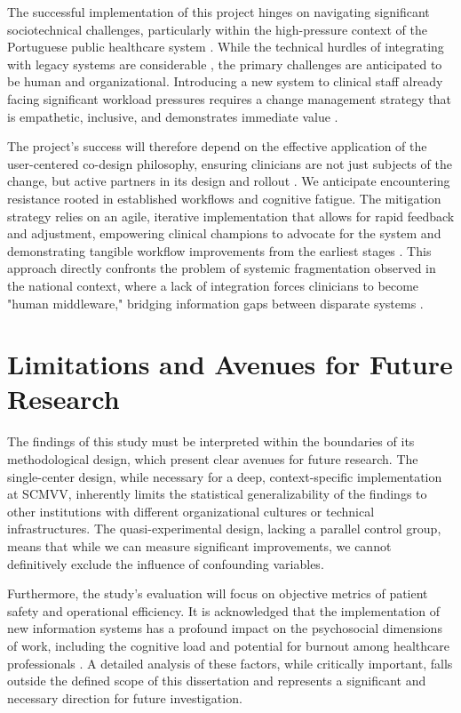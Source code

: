 The successful implementation of this project hinges on navigating significant sociotechnical challenges, particularly within the high-pressure context of the Portuguese public healthcare system \cite{goiana2024portuguese}. While the technical hurdles of integrating with legacy systems are considerable \cite{keasberry2017}, the primary challenges are anticipated to be human and organizational. Introducing a new system to clinical staff already facing significant workload pressures requires a change management strategy that is empathetic, inclusive, and demonstrates immediate value \cite{rogers2003}.

The project's success will therefore depend on the effective application of the user-centered co-design philosophy, ensuring clinicians are not just subjects of the change, but active partners in its design and rollout \cite{venkatesh2003}. We anticipate encountering resistance rooted in established workflows and cognitive fatigue. The mitigation strategy relies on an agile, iterative implementation that allows for rapid feedback and adjustment, empowering clinical champions to advocate for the system and demonstrating tangible workflow improvements from the earliest stages \cite{may2013}. This approach directly confronts the problem of systemic fragmentation observed in the national context, where a lack of integration forces clinicians to become "human middleware," bridging information gaps between disparate systems \cite{pinto2016identification}.

\section{Limitations and Avenues for Future Research}

The findings of this study must be interpreted within the boundaries of its methodological design, which present clear avenues for future research. The single-center design, while necessary for a deep, context-specific implementation at SCMVV, inherently limits the statistical generalizability of the findings to other institutions with different organizational cultures or technical infrastructures. The quasi-experimental design, lacking a parallel control group, means that while we can measure significant improvements, we cannot definitively exclude the influence of confounding variables.

Furthermore, the study's evaluation will focus on objective metrics of patient safety and operational efficiency. It is acknowledged that the implementation of new information systems has a profound impact on the psychosocial dimensions of work, including the cognitive load and potential for burnout among healthcare professionals \cite{hertzum2022}. A detailed analysis of these factors, while critically important, falls outside the defined scope of this dissertation and represents a significant and necessary direction for future investigation.

